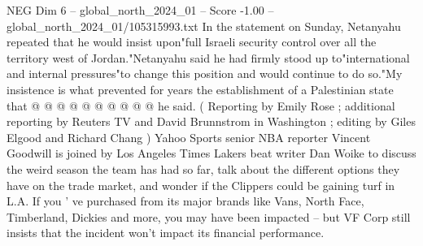 \begin{textsample}{NEG Dim 6 – global\_north\_2024\_01 – Score -1.00 – global\_north\_2024\_01/105315993.txt}
In the statement on Sunday, Netanyahu repeated that he would insist upon"full Israeli security control over all the territory west of Jordan."Netanyahu said he had firmly stood up to"international and internal pressures"to change this position and would continue to do so."My insistence is what prevented for years the establishment of a Palestinian state that @ @ @ @ @ @ @ @ @ @ he said. ( Reporting by Emily Rose ; additional reporting by Reuters TV and David Brunnstrom in Washington ; editing by Giles Elgood and Richard Chang ) Yahoo Sports senior NBA reporter Vincent Goodwill is joined by Los Angeles Times Lakers beat writer Dan Woike to discuss the weird season the team has had so far, talk about the different options they have on the trade market, and wonder if the Clippers could be gaining turf in L.A.
If you ' ve purchased from its major brands like Vans, North Face, Timberland, Dickies and more, you may have been impacted -- but VF Corp still insists that the incident won't impact its financial performance.

\end{textsample}
